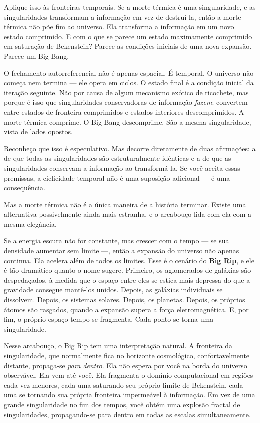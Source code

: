 \documentclass[11pt, twoside, openright]{book}
\begin{document}
Aplique isso às fronteiras temporais. Se a morte térmica é uma singularidade, e as singularidades transformam a informação em vez de destruí-la, então a morte térmica não põe fim ao universo. Ela transforma a informação em um novo estado comprimido. E com o que se parece um estado maximamente comprimido em saturação de Bekenstein? Parece as condições iniciais de uma nova expansão. Parece um Big Bang.

O fechamento autorreferencial não é apenas espacial. É temporal. O universo não começa nem termina --- ele opera em ciclos. O estado final é a condição inicial da iteração seguinte. Não por causa de algum mecanismo exótico de ricochete, mas porque é isso que singularidades conservadoras de informação \textit{fazem}: convertem entre estados de fronteira comprimidos e estados interiores descomprimidos. A morte térmica comprime. O Big Bang descomprime. São a mesma singularidade, vista de lados opostos.

Reconheço que isso é especulativo. Mas decorre diretamente de duas afirmações: a de que todas as singularidades são estruturalmente idênticas e a de que as singularidades conservam a informação ao transformá-la. Se você aceita essas premissas, a ciclicidade temporal não é uma suposição adicional --- é uma consequência.

Mas a morte térmica não é a única maneira de a história terminar. Existe uma alternativa possivelmente ainda mais estranha, e o arcabouço lida com ela com a mesma elegância.

Se a energia escura não for constante, mas crescer com o tempo --- se sua densidade aumentar sem limite ---, então a expansão do universo não apenas continua. Ela acelera além de todos os limites. Esse é o cenário do \textbf{Big Rip}, e ele é tão dramático quanto o nome sugere. Primeiro, os aglomerados de galáxias são despedaçados, à medida que o espaço entre eles se estica mais depressa do que a gravidade consegue mantê-los unidos. Depois, as galáxias individuais se dissolvem. Depois, os sistemas solares. Depois, os planetas. Depois, os próprios átomos são rasgados, quando a expansão supera a força eletromagnética. E, por fim, o próprio espaço-tempo se fragmenta. Cada ponto se torna uma singularidade.

Nesse arcabouço, o Big Rip tem uma interpretação natural. A fronteira da singularidade, que normalmente fica no horizonte cosmológico, confortavelmente distante, propaga-se \textit{para dentro}. Ela não espera por você na borda do universo observável. Ela vem até você. Ela fragmenta o domínio computacional em regiões cada vez menores, cada uma saturando seu próprio limite de Bekenstein, cada uma se tornando sua própria fronteira impermeável à informação. Em vez de uma grande singularidade no fim dos tempos, você obtém uma explosão fractal de singularidades, propagando-se para dentro em todas as escalas simultaneamente.
\end{document}
